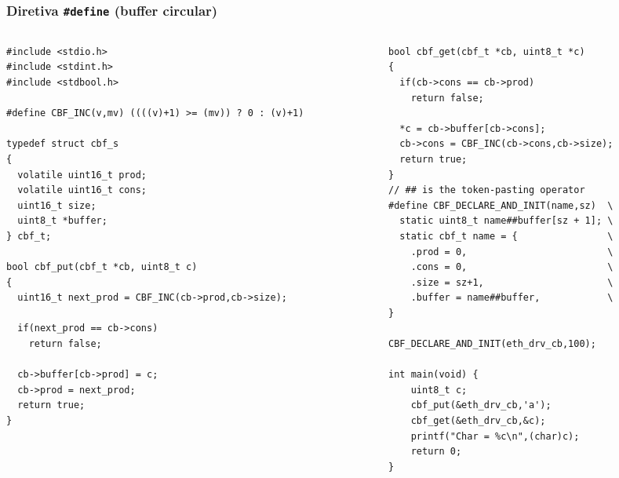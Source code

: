 \documentclass{beamer}
\begin{document}
\begin{frame}[fragile]
	\frametitle{Diretiva \texttt{\#define} (buffer circular)}
	\begin{columns}[T] %
		\begin{column}{.5\textwidth}
	\begin{lstlisting}[style=customc]
#include <stdio.h>
#include <stdint.h>
#include <stdbool.h>

#define CBF_INC(v,mv) ((((v)+1) >= (mv)) ? 0 : (v)+1)

typedef struct cbf_s
{
  volatile uint16_t prod;
  volatile uint16_t cons;
  uint16_t size;
  uint8_t *buffer;
} cbf_t;

bool cbf_put(cbf_t *cb, uint8_t c)
{
  uint16_t next_prod = CBF_INC(cb->prod,cb->size);

  if(next_prod == cb->cons)
    return false;

  cb->buffer[cb->prod] = c;
  cb->prod = next_prod;
  return true;
}
	\end{lstlisting}

		\end{column}%
		\hfill%
		\begin{column}{.5\textwidth}
	\begin{lstlisting}[style=customc]
bool cbf_get(cbf_t *cb, uint8_t *c)
{
  if(cb->cons == cb->prod)
    return false;

  *c = cb->buffer[cb->cons];
  cb->cons = CBF_INC(cb->cons,cb->size);
  return true;
}
// ## is the token-pasting operator
#define CBF_DECLARE_AND_INIT(name,sz)  \
  static uint8_t name##buffer[sz + 1]; \
  static cbf_t name = {                \
    .prod = 0,                         \
    .cons = 0,                         \
    .size = sz+1,                      \
    .buffer = name##buffer,            \
}

CBF_DECLARE_AND_INIT(eth_drv_cb,100);

int main(void) {
    uint8_t c;
    cbf_put(&eth_drv_cb,'a');
    cbf_get(&eth_drv_cb,&c);
    printf("Char = %c\n",(char)c);
    return 0;
}
	\end{lstlisting}

		\end{column}%
	\end{columns}
\end{frame}
\end{document}
